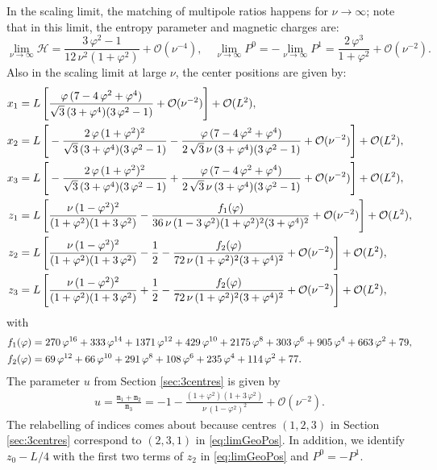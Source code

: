 \documentclass[12pt,a4paper]{article}
\newcommand{\mm}{\mathtt{m}}
\begin{document}
In the scaling limit, the matching of multipole ratios happens for $\nu\rightarrow\infty$; note that in this limit, the entropy parameter and magnetic charges are:
\begin{equation}\label{eq:entropyParLimGeo}
\lim\limits_{\nu\rightarrow\infty}\mathcal{H}=\frac{3\,\varphi^2-1}{12\,\nu^2(1+\varphi^2)}+\mathcal{O}(\nu^{-4}),\quad \lim\limits_{\nu\rightarrow\infty}P^0=-\lim\limits_{\nu\rightarrow\infty}P^1=\frac{2\,\varphi^3}{1+\varphi^2}+\mathcal{O}(\nu^{-2}).
\end{equation}
Also in the scaling limit at large $\nu$, the center positions are given by:
\begin{align}\label{eq:limGeoPos}
x_1&=L\,\Bigg[\frac{\varphi\,(7-4\,\varphi^2+\varphi^4)}{\sqrt{3}\,(3+\varphi^4)(3\,\varphi^2-1)}+\mathcal{O}(\nu^{-2})\Bigg]+\mathcal{O}(L^2),\notag\\
x_2&=L\,\Bigg[-\frac{2\,\varphi\,(1+\varphi^2)^2}{\sqrt{3}\,(3+\varphi^4)(3\,\varphi^2-1)}-\frac{\varphi\,(7-4\,\varphi^2+\varphi^4)}{2\,\sqrt{3}\,\nu\,(3+\varphi^4)(3\,\varphi^2-1)}+\mathcal{O}(\nu^{-2})\Bigg]+\mathcal{O}(L^2),\notag\\
x_3&=L\,\Bigg[-\frac{2\,\varphi\,(1+\varphi^2)^2}{\sqrt{3}\,(3+\varphi^4)(3\,\varphi^2-1)}+\frac{\varphi\,(7-4\,\varphi^2+\varphi^4)}{2\,\sqrt{3}\,\nu\,(3+\varphi^4)(3\,\varphi^2-1)}+\mathcal{O}(\nu^{-2})\Bigg]+\mathcal{O}(L^2),\notag\\
z_1&=L\,\Bigg[\frac{\nu\,(1-\varphi^2)^2}{(1+\varphi^2)(1+3\,\varphi^2)}-\frac{f_1(\varphi)}{36\,\nu\,(1-3\,\varphi^2)(1+\varphi^2)^2(3+\varphi^4)^2}+\mathcal{O}(\nu^{-2})\Bigg]+\mathcal{O}(L^2),\notag\\
z_2&=L\,\Bigg[\frac{\nu\,(1-\varphi^2)^2}{(1+\varphi^2)(1+3\,\varphi^2)}-\frac{1}{2}-\frac{f_2(\varphi)}{72\,\nu\,(1+\varphi^2)^2(3+\varphi^4)^2}+\mathcal{O}(\nu^{-2})\Bigg]+\mathcal{O}(L^2),\notag\\
z_3&=L\,\Bigg[\frac{\nu\,(1-\varphi^2)^2}{(1+\varphi^2)(1+3\,\varphi^2)}+\frac{1}{2}-\frac{f_2(\varphi)}{72\,\nu\,(1+\varphi^2)^2(3+\varphi^4)^2}+\mathcal{O}(\nu^{-2})\Bigg]+\mathcal{O}(L^2),
\end{align}
with
\begin{align}
f_1(\varphi)&=270\,\varphi^{16}+333\,\varphi^{14}+1371\,\varphi^{12}+429\,\varphi^{10}+2175\,\varphi^8+303\,\varphi^6+905\,\varphi^4+663\,\varphi^2+79,\notag\\
f_2(\varphi)&=69\,\varphi^{12}+66\,\varphi^{10}+291\,\varphi^8+108\,\varphi^6+235\,\varphi^4+114\,\varphi^2+77.
\end{align}
The parameter $u$ from Section \ref{sec:3centres} is given by
\begin{align}\label{eq:uLim}
u=\frac{\mm_1+\mm_2}{\mm_3}=-1-\frac{(1+\varphi^2)(1+3\,\varphi^2)}{\nu\,(1-\varphi^2)^2}+\mathcal{O}(\nu^{-2}).
\end{align}
The relabelling of indices comes about because centres $(1,2,3)$ in Section \ref{sec:3centres} correspond to $(2,3,1)$ in \eqref{eq:limGeoPos}. In addition, we identify $z_0-L/4$ with the first two terms of $z_2$ in \eqref{eq:limGeoPos} and $P^0=-P^1$.
\end{document}
